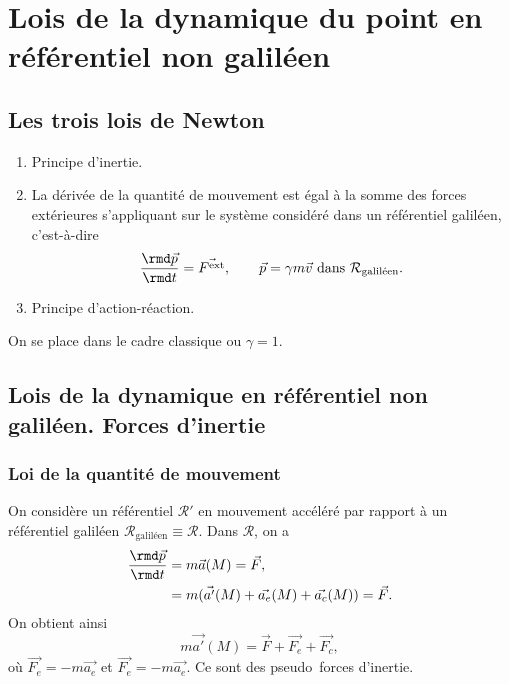 \section[Lois de la dynamique du point]{Lois de la dynamique du point en référentiel non galiléen}

    \subsection{Les trois lois de Newton}

        \begin{enumerate}[label=\arabic*.]
            \item Principe d'inertie.
            \item La dérivée de la quantité de mouvement est égal à la somme des forces extérieures s'appliquant sur le système considéré dans un référentiel galiléen, c'est-à-dire
            \begin{equation*}
                \frac{\rmd\vec{p}}{\rmd t}=\vec{F^{\text{ext}}},\qquad \vec{p}=\gamma m\vec{v}\text{ dans }\mathcal{R}_{\text{galiléen}}.
            \end{equation*}
            \item Principe d'action-réaction.
        \end{enumerate}
        On se place dans le cadre classique ou $\gamma=1$.
    
    \subsection{Lois de la dynamique en référentiel non galiléen. Forces d'inertie}
        \subsubsection{Loi de la quantité de mouvement}

            On considère un référentiel $\mathcal{R}'$ en mouvement accéléré par rapport à un référentiel galiléen $\mathcal{R}_{\text{galiléen}}\equiv\mathcal{R}$. Dans $\mathcal{R}$, on a 
            \begin{align*}
                \frac{\rmd\vec{p}}{\rmd t}
                &=
                m\vec{a}(M)=\vec{F},\\
                &=m(\vec{a'}(M)+\vec{a_e}(M)+\vec{a_c}(M))=\vec{F}.
            \end{align*}
            On obtient ainsi
            \begin{equation*}
                m\vec{a'}(M)=\vec{F}+\vec{F_e}+\vec{F_c},
            \end{equation*}
            où $\vec{F_e}=-m\vec{a_e}$ et $\vec{F_e}=-m\vec{a_e}$. Ce sont des \og pseudo\fg~forces d'inertie.

